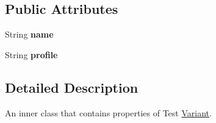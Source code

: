 \subsection*{Public Attributes}
\begin{DoxyCompactItemize}
\item 
\hypertarget{classcom_1_1shephertz_1_1app42_1_1paas_1_1sdk_1_1csharp_1_1ab_test_1_1_a_b_test_1_1_variant_a5be815f03d075cd2c982e52b03d463d4}{String {\bfseries name}}\label{classcom_1_1shephertz_1_1app42_1_1paas_1_1sdk_1_1csharp_1_1ab_test_1_1_a_b_test_1_1_variant_a5be815f03d075cd2c982e52b03d463d4}

\item 
\hypertarget{classcom_1_1shephertz_1_1app42_1_1paas_1_1sdk_1_1csharp_1_1ab_test_1_1_a_b_test_1_1_variant_a1c3ee2cfbf0458929d961be9406d8b65}{String {\bfseries profile}}\label{classcom_1_1shephertz_1_1app42_1_1paas_1_1sdk_1_1csharp_1_1ab_test_1_1_a_b_test_1_1_variant_a1c3ee2cfbf0458929d961be9406d8b65}

\end{DoxyCompactItemize}


\subsection{Detailed Description}
An inner class that contains properties of Test \hyperlink{classcom_1_1shephertz_1_1app42_1_1paas_1_1sdk_1_1csharp_1_1ab_test_1_1_a_b_test_1_1_variant}{Variant}. 

